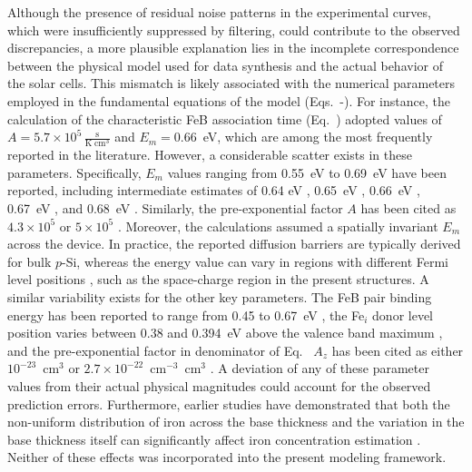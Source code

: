 \documentclass[10pt]{iopart}
\begin{document}
Although the presence of residual noise patterns in the experimental curves, which were
insufficiently suppressed by filtering, could contribute to the observed discrepancies,
a more plausible explanation lies in the incomplete correspondence between the physical model used for data synthesis and the actual behavior of the solar cells.
This mismatch is likely associated with the numerical parameters employed in the  fundamental equations of the model (Eqs.~-).
For instance, the calculation of the characteristic FeB association time (Eq.~) adopted values of
$A=5.7\times10^5\,\frac{\mathrm{s}}{\mathrm{K}\;\mathrm{cm}^3}$ and $E_m=0.66$~eV, which are among the most frequently reported in the literature.
However, a considerable scatter exists in these parameters.
Specifically, $E_m$ values ranging from 0.55~eV \cite{Lauer2016} to 0.69~eV \cite{FeBStrongIll} have been reported,
including intermediate estimates of 0.64 eV \cite{Zhu2011}, 0.65~eV \cite{KimerlingFeB},
0.66~eV \cite{FeBAssSST2011, Le2024, FeBKin2019, FeBJAP2005},
0.67~eV \cite{Zhu2015}, and 0.68~eV \cite{Wijaranakula, Macdonald2004, Zoth1990}.
Similarly, the pre-exponential factor $A$ has been cited as $4.3\times10^5$ \cite{FeBLight2} or $5\times10^5$ \cite{FeBJAP2005, FeBkinAPL2008}.
Moreover, the calculations assumed a spatially invariant $E_m$ across the device.
In practice, the reported diffusion barriers are typically derived for bulk $p$-Si,
whereas the energy value can vary in regions with different Fermi level positions \cite{Murphy2014}, such as the space-charge region in the present structures.
A similar variability exists for the other key parameters.
The FeB pair binding energy has been reported to range from 0.45 to 0.67~eV \cite{KimerlingFeB, Zhu2015, Wijaranakula, Hayamizu1991},
the Fe$_i$ donor level position varies between 0.38 and 0.394~eV above the valence band maximum \cite{FeBAssJAP2014, Macdonald2004, FeB:Schmidt, Narland},
and the pre-exponential factor in denominator of Eq.~ $A_z$ has been cited as either
$10^{-23}$~cm$^{3}$ or $2.7\times10^{-22}$~cm$^{-3}$~cm$^{3}$ \cite{Zhu2015}.
A deviation of any of these parameter values from their actual physical magnitudes could account for the observed prediction errors.
Furthermore, earlier studies have demonstrated that both the non-uniform distribution of iron across the base thickness
and the variation in the base thickness itself can significantly affect iron concentration estimation \cite{KimerlingFeB}.
Neither of these effects was incorporated into the present modeling framework.
\end{document}
